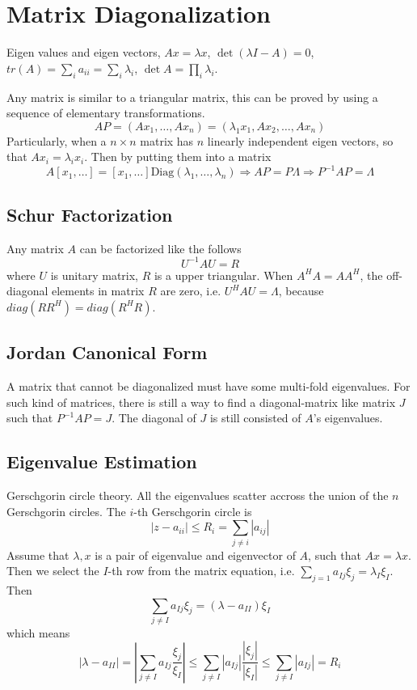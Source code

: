 
\section{Matrix Diagonalization}

Eigen values and eigen vectors, $Ax=\lambda x$, $\det(\lambda I - A)=0$,
$tr(A) = \sum_i a_{ii} = \sum_i \lambda_i$, $\det A = \prod_i \lambda_i$.

Any matrix is similar to a triangular matrix, this can be proved by using
a sequence of elementary transformations.
$$AP=(Ax_1,\ldots,Ax_n)=(\lambda_1 x_1, Ax_2, \ldots, Ax_n)$$
Particularly, when a $n\times n$ matrix has $n$ linearly independent eigen
vectors, so that $Ax_i = \lambda_i x_i$. Then by putting them into a matrix
$$A[x_1,\ldots] = [x_1,\ldots] \text{Diag}(\lambda_1, \ldots, \lambda_n)
  \Rightarrow AP=P\Lambda \Rightarrow P^{-1}AP = \Lambda$$

\subsection{Schur Factorization}

Any matrix $A$ can be factorized like the follows
$$U^{-1}AU = R$$
where $U$ is unitary matrix, $R$ is a upper triangular.
When $A^HA=AA^H$, the off-diagonal elements in matrix $R$ are zero,
i.e. $U^HAU=\Lambda$, because $diag(RR^H)=diag(R^HR)$.

\subsection{Jordan Canonical Form}

A matrix that cannot be diagonalized must have some multi-fold eigenvalues.
For such kind of matrices, there is still a way to find a diagonal-matrix
like matrix $J$ such that $P^{-1}AP=J$. The diagonal of $J$ is still consisted
of $A$'s eigenvalues.

\subsection{Eigenvalue Estimation}

Gerschgorin circle theory. All the eigenvalues scatter accross the union
of the $n$ Gerschgorin circles. The $i$-th Gerschgorin circle is
$$ |z - a_{ii}| \leq R_i = \sum_{j\ne i} |a_{ij}|$$
Assume that $\lambda, x$ is a pair of eigenvalue and eigenvector of $A$,
such that $Ax=\lambda x$. Then we select the $I$-th row from the matrix
equation, i.e. $\sum_{j=1} a_{Ij}\xi_j = \lambda_I \xi_I$. Then
$$ \sum_{j\ne I} a_{Ij} \xi_j = (\lambda - a_{II})\xi_I$$
which means
$$|\lambda - a_{II}| = |\sum_{j\ne I} a_{Ij} \frac{\xi_j}{\xi_I}|
  \leq \sum_{j\ne I} |a_{Ij}| \frac{|\xi_j|}{|\xi_I|} \leq
  \sum_{j\ne I} |a_{Ij}| = R_i$$
